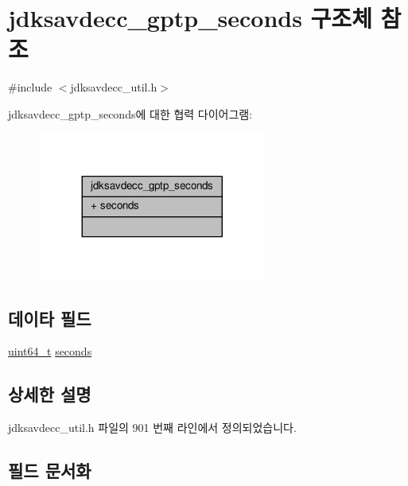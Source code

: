 \hypertarget{structjdksavdecc__gptp__seconds}{}\section{jdksavdecc\+\_\+gptp\+\_\+seconds 구조체 참조}
\label{structjdksavdecc__gptp__seconds}


{\ttfamily \#include $<$jdksavdecc\+\_\+util.\+h$>$}



jdksavdecc\+\_\+gptp\+\_\+seconds에 대한 협력 다이어그램\+:
\nopagebreak
\begin{figure}[H]
\begin{center}
\leavevmode
\includegraphics[width=212pt]{structjdksavdecc__gptp__seconds__coll__graph}
\end{center}
\end{figure}
\subsection*{데이타 필드}
\begin{DoxyCompactItemize}
\item 
\hyperlink{parse_8c_aec6fcb673ff035718c238c8c9d544c47}{uint64\+\_\+t} \hyperlink{structjdksavdecc__gptp__seconds_aae1213f8226839b7226bcbfb6f1e568d}{seconds}
\end{DoxyCompactItemize}


\subsection{상세한 설명}


jdksavdecc\+\_\+util.\+h 파일의 901 번째 라인에서 정의되었습니다.



\subsection{필드 문서화}
